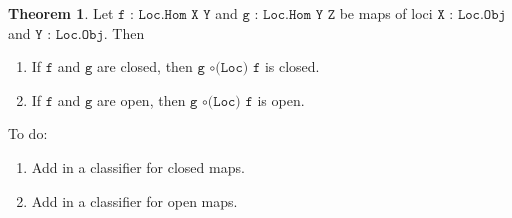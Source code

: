 \documentclass{book}
\theoremstyle{definition}
\newtheorem{theorem}{Theorem}
\begin{document}
\begin{theorem}
Let $\texttt{f : Loc.Hom X Y}$ and $\texttt{g : Loc.Hom Y Z}$ be maps of loci $\texttt{X : Loc.Obj}$ and $\texttt{Y : Loc.Obj}$. Then
\begin{enumerate}
\item If $\texttt{f}$ and $\texttt{g}$ are closed, then $\texttt{g ∘(Loc) f}$ is closed.
\item If $\texttt{f}$ and $\texttt{g}$ are open, then $\texttt{g ∘(Loc) f}$ is open.
\end{enumerate} 
\end{theorem}


To do:
\begin{enumerate}
\item Add in a classifier for closed maps.
\item Add in a classifier for open maps.
\end{enumerate}

\end{document}
